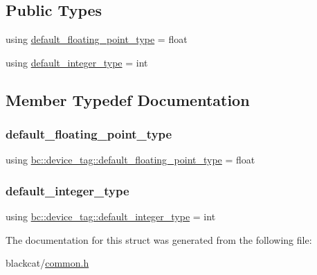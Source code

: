 \subsection*{Public Types}
\begin{DoxyCompactItemize}
\item 
using \hyperlink{structbc_1_1device__tag_a7062e9d6db16c17b5291154ef5955ce8}{default\+\_\+floating\+\_\+point\+\_\+type} = float
\item 
using \hyperlink{structbc_1_1device__tag_a84c33f280498abc2a0f6441cead04d71}{default\+\_\+integer\+\_\+type} = int
\end{DoxyCompactItemize}


\subsection{Member Typedef Documentation}
\mbox{\label{structbc_1_1device__tag_a7062e9d6db16c17b5291154ef5955ce8}} 
\subsubsection{\texorpdfstring{default\+\_\+floating\+\_\+point\+\_\+type}{default\_floating\_point\_type}}
{\footnotesize\ttfamily using \hyperlink{structbc_1_1device__tag_a7062e9d6db16c17b5291154ef5955ce8}{bc\+::device\+\_\+tag\+::default\+\_\+floating\+\_\+point\+\_\+type} =  float}

\mbox{\label{structbc_1_1device__tag_a84c33f280498abc2a0f6441cead04d71}} 
\subsubsection{\texorpdfstring{default\+\_\+integer\+\_\+type}{default\_integer\_type}}
{\footnotesize\ttfamily using \hyperlink{structbc_1_1device__tag_a84c33f280498abc2a0f6441cead04d71}{bc\+::device\+\_\+tag\+::default\+\_\+integer\+\_\+type} =  int}



The documentation for this struct was generated from the following file\+:\begin{DoxyCompactItemize}
\item 
blackcat/\hyperlink{common_8h}{common.\+h}\end{DoxyCompactItemize}
